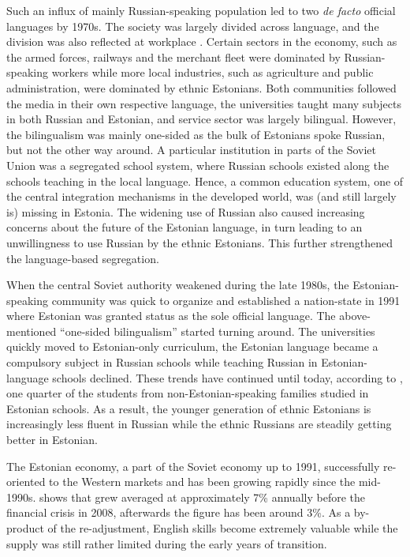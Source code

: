 \documentclass[12pt, a4paper]{article}
\begin{document}
Such an influx of mainly
Russian-speaking population
led to two \emph{de facto} official languages
by 1970s.
The society was largely divided across language, and the division was
also reflected at workplace \citep{leppik+vihalemm2015JofBaltStud}.
Certain sectors in the economy, such as the armed forces, railways and the
merchant fleet
were dominated by
Russian-speaking workers while more local industries,
such as agriculture and
public administration,
were dominated by ethnic Estonians.
Both communities followed the media in their own respective language, the
universities taught many subjects in both Russian and Estonian,
and service sector was largely bilingual. However, the bilingualism
was mainly one-sided as the bulk of Estonians spoke Russian, but not
the other way around. A particular institution in parts of the Soviet
Union was a segregated school system, where Russian schools existed along the
schools teaching in the local language. Hence, a common education
system, one of the central integration mechanisms in the developed world,
was (and still largely is) missing in Estonia.
The widening use of Russian also
caused increasing concerns about the future of the Estonian
language, in turn leading to an unwillingness to use Russian by
the ethnic Estonians. This further strengthened the language-based segregation.

When the central Soviet authority weakened during the late 1980s, the
Estonian-speaking community was quick to organize and established a
nation-state in 1991 where
Estonian was granted status as the sole official language. The
above-mentioned ``one-sided bilingualism'' started turning
around. The universities quickly moved to Estonian-only curriculum,
the Estonian language became a compulsory subject in Russian schools
while teaching Russian in Estonian-language schools declined.
These trends have continued until today, according to
\citet{HTM2015}, one quarter of the students from non-Estonian-speaking families studied in Estonian schools.
As a result, the younger generation of ethnic Estonians is
increasingly less fluent in Russian while the ethnic Russians are
steadily getting better in Estonian.

The Estonian economy, a part of the Soviet economy up to 1991, successfully
re-oriented to the Western markets and has been growing rapidly since
the mid-1990s. 
 shows that grew averaged at approximately 7\%
annually
before the financial crisis in 2008, afterwards the figure has been around 3\%.
As a by-product of the re-adjustment, English skills become extremely
valuable while the supply was still rather limited during the early
years of transition.
\end{document}
